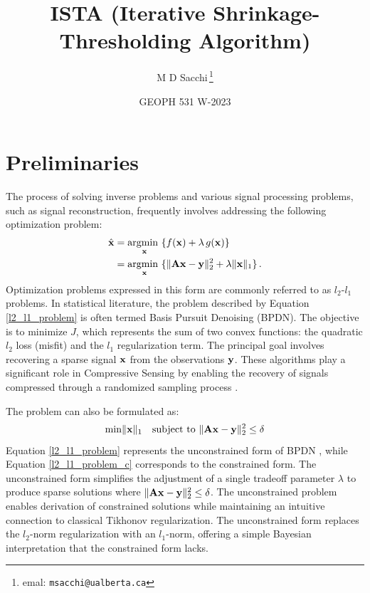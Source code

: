 \documentclass[11pt, oneside]{article}  	%
\title{ISTA (Iterative Shrinkage-Thresholding Algorithm) }
\author{M D Sacchi\,\footnote{emal: \texttt{msacchi@ualberta.ca}} }
\date{GEOPH 531 W-2023}
\def\be{\vspace{0.0cm}\begin{equation}}
\def\ee{\vspace{0.0cm}\end{equation}}
\begin{document}
\maketitle

\section{Preliminaries}


The process of solving inverse problems and various signal processing problems, such as signal reconstruction, frequently involves addressing the following optimization problem:
\begin{align}
\hat{{\bf x }} &= \underset{{\bf x}}{\mbox{argmin }} \{ f({\bf x}) + \lambda\, g({\bf x}) \} \nonumber\\
      &= \underset{{\bf x}}{\mbox{argmin }} \{ \| {\bf A} {\bf x} - {\bf y} \|_2^2 + \lambda \| {\bf x} \|_1 \} \,.\label{l2_l1_problem}
\end{align}
Optimization problems expressed in this form are commonly referred to as \(l_2\)-\(l_1\) problems. In statistical literature, the problem described by Equation \ref{l2_l1_problem} is often termed Basis Pursuit Denoising (BPDN). The objective is to minimize \(J\), which represents the sum of two convex functions: the quadratic \(l_2\) loss (misfit) and the \(l_1\) regularization term. The principal goal involves recovering a sparse signal \({\bf x}\) from the observations \({\bf y}\). These algorithms play a significant role in Compressive Sensing by enabling the recovery of signals compressed through a randomized sampling process \citep{CS_Tutorial}. 

The problem can also be formulated as:
\be
\mbox{min} \| {\bf x} \|_1 \quad \mbox{subject to } \| {\bf A} {\bf x} -{\bf y} \|_2^2 \le \delta 
 \label{l2_l1_problem_c}
\ee
Equation \ref{l2_l1_problem} represents the unconstrained form of BPDN \citep{BPDN}, while Equation \ref{l2_l1_problem_c} corresponds to the constrained form. The unconstrained form simplifies the adjustment of a single tradeoff parameter \(\lambda\) to produce sparse solutions where \(\| {\bf A} {\bf x} -{\bf y} \|_2^2 \le \delta\). The unconstrained problem enables derivation of constrained solutions while maintaining an intuitive connection to classical Tikhonov regularization. The unconstrained form replaces the \(l_2\)-norm regularization with an \(l_1\)-norm, offering a simple Bayesian interpretation that the constrained form lacks.
\end{document}
